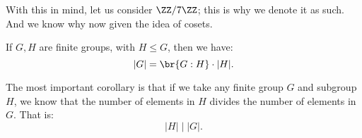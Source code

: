 \documentclass[openany]{book}
\begin{document}
\begin{example}
	With this in mind, let us consider $\ZZ/7\ZZ$; this is why we denote it as such. And we know why now given the idea of cosets.
\end{example}

\begin{thm}
	If $G, H$ are finite groups, with $H \leq G$, then we have:
	\begin{equation*}
		\lvert G \rvert = \br{G:H} \cdot \lvert H \rvert.
	\end{equation*}
\end{thm}

\begin{cor}
	The most important corollary is that if we take any finite group $G$ and subgroup $H$, we know that the number of elements in $H$ divides the number of elements in $G$. That is:
	\begin{equation*}
		\lvert H \rvert \mid \lvert G \rvert.
	\end{equation*}
\end{cor}
\end{document}
